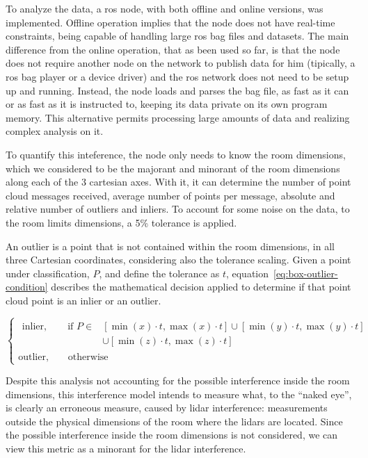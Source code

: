 To analyze the data, a \ac{ros} node, with both offline and online versions, was implemented. Offline operation implies that the node does not have real-time constraints, being capable of handling large \ac{ros} bag files and datasets. The main difference from the online operation, that as been used so far, is that the node does not require another node on the network to publish data for him (tipically, a \ac{ros} bag player or a device driver) and the \ac{ros} network does not need to be setup up and running. Instead, the node loads and parses the bag file, as fast as it can or as fast as it is instructed to, keeping its data private on its own program memory. This alternative permits processing large amounts of data and realizing complex analysis on it.

To quantify this inteference, the node only needs to know the room dimensions, which we considered to be the majorant and minorant of the room dimensions along each of the 3 cartesian axes. With it, it can determine the number of point cloud messages received, average number of points per message, absolute and relative number of outliers and inliers. To account for some noise on the data, to the room limits dimensions, a 5\% tolerance is applied. 

An outlier is a point that is not contained within the room dimensions, in all three Cartesian coordinates, considering also the tolerance scaling. Given a point under classification, $P$, and define the tolerance as $t$, equation~\ref{eq:box-outlier-condition} describes the mathematical decision applied to determine if that point cloud point is an inlier or an outlier.

\begin{equation}
	\label{eq:box-outlier-condition}
	\begin{cases}
		\begin{aligned}
			\text{inlier}, \qquad \text{if } P \in & [\min(x) \cdot t, \max(x) \cdot t] \cup [\min(y) \cdot t, \max(y) \cdot t]  \\
																						&					 \cup [\min(z) \cdot t, \max(z) \cdot t] 
		\end{aligned} \\
		\text{outlier}, \qquad \text{otherwise}
	\end{cases}
\end{equation}

Despite this analysis not accounting for the possible interference inside the room dimensions, this interference model intends to measure what, to the ``naked eye'', is clearly an erroneous measure, caused by \ac{lidar} interference: measurements outside the physical dimensions of the room where the \acp{lidar} are located. Since the possible interference inside the room dimensions is not considered, we can view this metric as a minorant for the \ac{lidar} interference.


